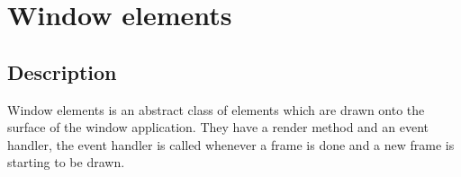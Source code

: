 \documentclass{scrartcl}
\begin{document}
    \section{Window elements}
    \subsection{Description}
    Window elements is an abstract class of elements which are drawn onto the surface of the window application. They have a render 
    method and an event handler, the event handler is called whenever a frame is done and a new frame is starting to be drawn.
\end{document}
